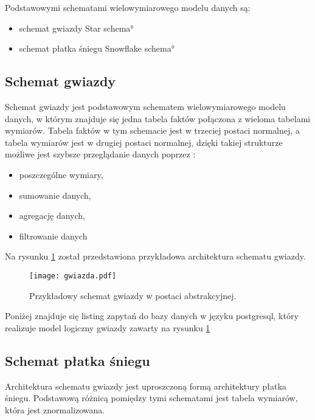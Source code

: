 Podstawowymi schematami wielowymiarowego modelu danych są:
\begin{itemize}
 \item schemat gwiazdy \ang{Star schema} 
 \item schemat płatka śniegu \ang{Snowflake schema}
\end{itemize}

\subsection{Schemat gwiazdy}
Schemat gwiazdy jest podstawowym schematem wielowymiarowego modelu danych,
 w którym znajduje się jedna tabela faktów połączona z wieloma tabelami wymiarów.
Tabela faktów w tym schemacie jest w trzeciej postaci normalnej, a tabela wymiarów jest w drugiej postaci normalnej,
dzięki takiej strukturze możliwe jest szybsze przeglądanie danych poprzez \cite{TodMan} \cite{link_hd}:
\begin{itemize}
 \item poszczególne wymiary,
 \item sumowanie danych,
 \item agregację danych,
 \item filtrowanie danych
\end{itemize}

Na rysunku  \ref{fig:gwiazda} został przedstawiona przykładowa architektura schematu gwiazdy.
\begin{center}
\begin{figure}[H]
  \begin{center}
    \texttt{[image: gwiazda.pdf]}
  \end{center}
  \caption{Przykładowy schemat gwiazdy w postaci abstrakcyjnej. }
    \label{fig:gwiazda}
\end{figure}
\end{center}
Poniżej znajduje się listing zapytań do bazy danych w języku postgresql,
 który realizuje model logiczny gwiazdy zawarty na rysunku \ref{fig:gwiazda}


\subsection{Schemat płatka śniegu}
Architektura schematu gwiazdy jest uproszczoną formą architektury płatka śniegu.
Podstawową różnicą pomiędzy tymi schematami jest tabela wymiarów, która jest znormalizowana.

